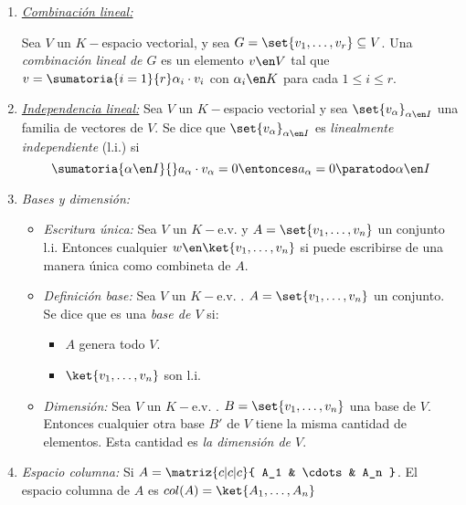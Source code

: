\begin{enumerate}[label=\tiny\purple{\faIcon{snowman}}]
  \item \hypertarget{teoria-1:combinacion-lineal}{\textit{\ul{Combinación lineal:}}}

        Sea $V$ un $K-$espacio vectorial, y sea $G = \set{v_1,\ldots,v_r} \subseteq V$.
        Una \textit{combinación lineal de $G$} es un elemento $v \en V$ tal que $v = \sumatoria{i=1}{r} \alpha_i \cdot v_i$ con
        $\alpha_i \en K$ para cada $1 \leq i \leq r$.

  \item\textit{\ul{Independencia lineal:}}
        Sea $V$ un $K-$espacio vectorial y sea $\set{v_\alpha}_{\alpha \en I}$ una familia de vectores de $V$. Se
        dice que  $\set{v_{\alpha}}_{\alpha \en I}$ es \textit{linealmente independiente} (l.i.) si
        $$
          \sumatoria{\alpha \en I}{} a_{\alpha} \cdot v_{\alpha} = 0 \entonces a_{\alpha} = 0 \paratodo \alpha \en I
        $$

  \item \textit{Bases y dimensión:}
        \begin{itemize}
          \item \textit{Escritura única:}
                Sea $V$ un $K-$e.v. y $A = \set{v_1,\ldots,v_n}$ un conjunto l.i. Entonces cualquier $w \en \ket{v_1,\ldots, v_n}$ si puede
                escribirse de una manera única como combineta de $A$.

          \item \textit{Definición base:}
                Sea $V$ un $K-$e.v. . $A = \set{v_1,\ldots,v_n}$ un conjunto. Se dice que es una \textit{base de $V$} si:
                \begin{itemize}
                  \item $A$ genera todo $V$.
                  \item $\ket{v_1,\ldots, v_n}$ son l.i.
                \end{itemize}

          \item \textit{Dimensión:}
                Sea $V$ un $K-$e.v. . $B = \set{v_1,\ldots,v_n}$ una base de $V$. Entonces cualquier otra base $B'$ de $V$ tiene
                la misma cantidad de elementos. Esta cantidad es \textit{la dimensión de $V$}.
        \end{itemize}

  \item \textit{Espacio columna:} Si
        $A =
          \matriz{c|c|c}{
            A_1 & \cdots & A_n
          }
        $. El espacio columna de $A$ es $col(A) = \ket{A_1, \ldots, A_n}$


\end{enumerate}
